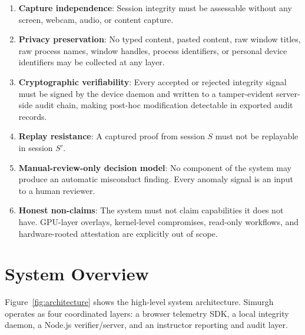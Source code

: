\documentclass[conference]{IEEEtran}
\begin{document}
\begin{enumerate}
\item \textbf{Capture independence}: Session integrity must be assessable without any screen, webcam, audio, or content capture.

\item \textbf{Privacy preservation}: No typed content, pasted content, raw window titles, raw process names, window handles, process identifiers, or personal device identifiers may be collected at any layer.

\item \textbf{Cryptographic verifiability}: Every accepted or rejected integrity signal must be signed by the device daemon and written to a tamper-evident server-side audit chain, making post-hoc modification detectable in exported audit records.

\item \textbf{Replay resistance}: A captured proof from session $S$ must not be replayable in session $S'$.

\item \textbf{Manual-review-only decision model}: No component of the system may produce an automatic misconduct finding. Every anomaly signal is an input to a human reviewer.

\item \textbf{Honest non-claims}: The system must not claim capabilities it does not have. GPU-layer overlays, kernel-level compromises, read-only workflows, and hardware-rooted attestation are explicitly out of scope.
\end{enumerate}

\section{System Overview}

Figure~\ref{fig:architecture} shows the high-level system architecture. Simurgh operates as four coordinated layers: a browser telemetry SDK, a local integrity daemon, a Node.js verifier/server, and an instructor reporting and audit layer.
\end{document}
